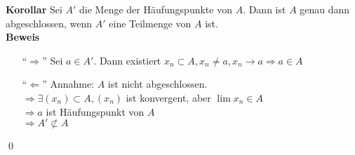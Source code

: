 \documentclass[ngerman,titlepage,twoside, parskip=half*]{scrreprt}
\theoremstyle{plain}
\theoremstyle{definition}
\theoremstyle{remark}
\begin{document}
\textbf{Korollar} Sei $A'$ die Menge der Häufungspunkte von $A$. Dann ist $A$ genau dann abgeschlossen, wenn
$A'$ eine Teilmenge von $A$ ist.\\
\textbf{Beweis}
\begin{itemize}
  \item["`$\Rightarrow$"'] Sei $a\in A'$. Dann existiert $x_n \subset A, x_n\neq a, x_n\rightarrow a
    \Rightarrow a \in A$
  \item["`$\Leftarrow$"'] Annahme: $A$ ist nicht abgeschlossen.\\
    $\Rightarrow \exists (x_n) \subset A, (x_n)$ ist konvergent, aber $\lim x_n\in A$\\
    $\Rightarrow a$ ist Häufungspunkt von $A$\\
    $\Rightarrow A'\not\subset A$\lightning
\end{itemize}
\qed
\end{document}
